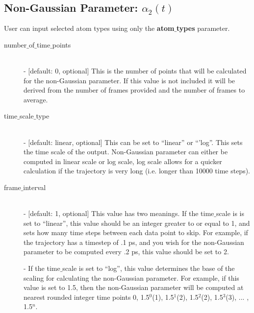 \documentclass{article}
\begin{document}
\subsection{Non-Gaussian Parameter: $\alpha_2(t)$} \label{sec::alpha2_parm}
User can input selected atom types using only the \textbf{atom$\_$types} parameter.
\begin{description}	
	\item[number$\_$of$\_$time$\_$points]\hfill \\
	- [default: 0, optional] This is the number of points that will be calculated for the non-Gaussian parameter.  If this value is not included it will be derived from the number of frames provided and the number of frames to average.
	
	\item[time$\_$scale$\_$type] \hfill \\
	- [default: linear, optional] This can be set to ``linear'' or ``'log''.  This sets the time scale of the output. Non-Gaussian parameter can either be computed in linear scale or log scale, log scale allows for a quicker calculation if the trajectory is very long (i.e. longer than 10000 time steps).
	
	\item[frame$\_$interval] \hfill \\
	- [default: 1, optional] This value has two meanings.  If the time$\_$scale is is set to ``linear'', this value should be an integer greater to or equal to 1, and sets how many time steps between each data point to skip.  For example, if the trajectory has a timestep of .1 ps, and you wish for the non-Gaussian parameter to be computed every .2 ps, this value should be set to 2. 
	
	- If the time$\_$scale is set to ``log'', this value determines the base of the scaling for calculating the non-Gaussian parameter.   For example, if this value is set to 1.5, then the non-Gaussian parameter will be computed at nearest rounded integer time points 0, 1.5$^0$(1), 1.5$^1$(2), 1.5$^2$(2), 1.5$^3$(3), ... , 1.5$^{n}$.
	
\end{description}
\end{document}
